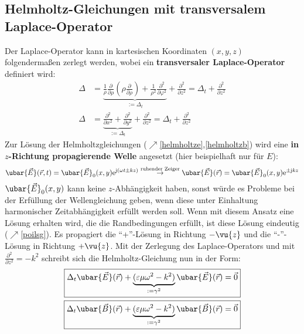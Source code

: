 \subsection{Helmholtz-Gleichungen mit transversalem Laplace-Operator}
	Der Laplace-Operator kann in kartesischen Koordinaten \((x,y,z)\) folgendermaßen zerlegt werden, wobei ein \textbf{transversaler Laplace-Operator} definiert wird:
	\begin{equation}\begin{split}
			\Delta &= \underbrace{\frac{1}{\rho}\frac{\partial }{\partial \rho}\left(\rho\frac{\partial }{\partial \rho}\right)+\frac{1}{\rho^{2}}\frac{\partial^{2}}{\partial \varphi^{2}}}_{:=\Delta _t}+\frac{\partial^{2}}{\partial z^{2}} = \Delta _t + \frac{\partial^{2}}{\partial z^{2}}\\
			\Delta &= \underbrace{\frac{\partial^2}{\partial x^2}+\frac{\partial^2}{\partial y^2}}_{:=\Delta _t}+\frac{\partial^2}{\partial z^2} = \Delta _t + \frac{\partial^{2}}{\partial z^{2}}
	\end{split}\end{equation}
	 Zur Lösung der Helmholtzgleichungen ($\nearrow$\ref{helmholtze},\ref{helmholtzb})
	wird eine \textbf{in \(z\)-Richtung propagierende Welle} angesetzt (hier beispielhaft nur für $E$):
	\begin{equation}
		\ubar{\vec{E}}(\vec{r} , t) = \ubar{\vec{E}}_0(x,y)  \mathrm{e}^{\mathrm{j}(\omega t \pm  k z)} \stackrel{\text{ruhender Zeiger}}{\to}  \ubar{\vec{E}}(\vec{r} ) = \ubar{\vec{E}}_0(x,y)  \mathrm{e}^{\pm\mathrm{j} k z}
	\end{equation}
$\ubar{\vec{E}}_0(x,y)$ kann keine $z$-Abhängigkeit haben, sonst würde es Probleme bei der Erfüllung der Wellengleichung geben, wenn diese unter Einhaltung harmonischer Zeitabhängigkeit erfüllt werden soll. Wenn mit diesem Ansatz eine Lösung erhalten wird, die die Randbedingungen erfüllt, ist diese Lösung eindeutig ($\nearrow$\ref{poilsg}). Es propagiert die \enquote{+}-Lösung in Richtung \(-\vu{z}\) und die \enquote{-}-Lösung in Richtung \(+\vu{z}\).	 Mit der Zerlegung des Laplace-Operators und mit \(\frac{\partial^2}{\partial z^2} = - k^2\) schreibt sich die Helmholtz-Gleichung nun in der Form:
	\begin{equation}\label{helmholtzmitgamma}\begin{split}
		\Aboxed{\Delta _t \ubar{\vec{E}}(\vec{r} ) + \underbrace{(\varepsilon\mu\omega^2 -  k^2)}_{:=\gamma^2} \ubar{\vec{E}}(\vec{r} ) &=\vec{0}}\\
			\Aboxed{\Delta _t \ubar{\vec{B}}(\vec{r} ) + \underbrace{(\varepsilon\mu\omega^2 -  k^2)}_{:=\gamma^2} \ubar{\vec{B}}(\vec{r} ) &=\vec{0}}
	\end{split}\end{equation}
